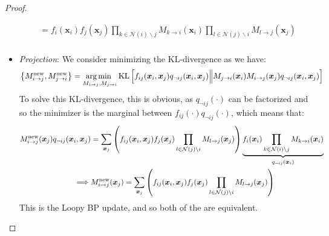 \begin{proof}
\begin{itemize}
\begin{equation*}
\begin{aligned}
            &= f_i(\boldsymbol x_i)f_j(\boldsymbol x_j)\prod_{k\in\mathcal{N}(i) \backslash j}M_{k\rightarrow i}(\boldsymbol x_i)\prod_{l\in\mathcal{N}(j)\backslash i}M_{l\rightarrow j}(\boldsymbol x_j) \\
        \end{aligned}
        \end{equation*}
        \item \emph{Projection}: We consider minimizing the KL-divergence as we have:
        \begin{equation*}
            \left\{ M^\text{new}_{i\rightarrow j}, M^\text{new}_{j\rightarrow i} \right\} = \underset{M_{i\rightarrow j}, M_{j\rightarrow i}}{\arg\min \ } \operatorname{KL}\left[  f_{ij}(\boldsymbol x_i, \boldsymbol x_j) q_{\neg ij}(\boldsymbol x_i, \boldsymbol x_j) \Big\| M_{j\rightarrow i}(\boldsymbol x_i) M_{i\rightarrow j}(\boldsymbol x_j)q_{\neg ij}(\boldsymbol x_i, \boldsymbol x_j)  \right]
        \end{equation*}
        To solve this KL-divergence, this is obvious, as $q_{\neg ij}(\cdot)$ can be factorized and so the minimizer is the marginal between $f_{ij}(\cdot)q_{\neg ij}(\cdot)$, which means that:
        \begin{equation*}
        \begin{aligned}
            M_{i\rightarrow j}^\text{new}(\boldsymbol x_j)q_{\neg ij}(\boldsymbol x_i, \boldsymbol x_j)& = \sum_{\boldsymbol x_j}\left( f_{ij}(\boldsymbol x_i, \boldsymbol x_j) f_j(\boldsymbol x_j)\prod_{l\in\mathcal{N}(j)\backslash i}M_{l\rightarrow j}(\boldsymbol x_j)  \right) \underbrace{f_i(\boldsymbol x_i)\prod_{k\in\mathcal{N}(i) \backslash j}M_{k\rightarrow i}(\boldsymbol x_i)}_{q_{\neg ij}(\boldsymbol x_i)} \\
            \implies& M_{i\rightarrow j}^\text{new}(\boldsymbol x_j) = \sum_{\boldsymbol x_j}\left( f_{ij}(\boldsymbol x_i, \boldsymbol x_j) f_j(\boldsymbol x_j)\prod_{l\in\mathcal{N}(j)\backslash i}M_{l\rightarrow j}(\boldsymbol x_j)  \right)
        \end{aligned}
        \end{equation*}
        This is the Loopy BP update, and so both of the are equivalent. 
    \end{itemize}
\end{proof}

